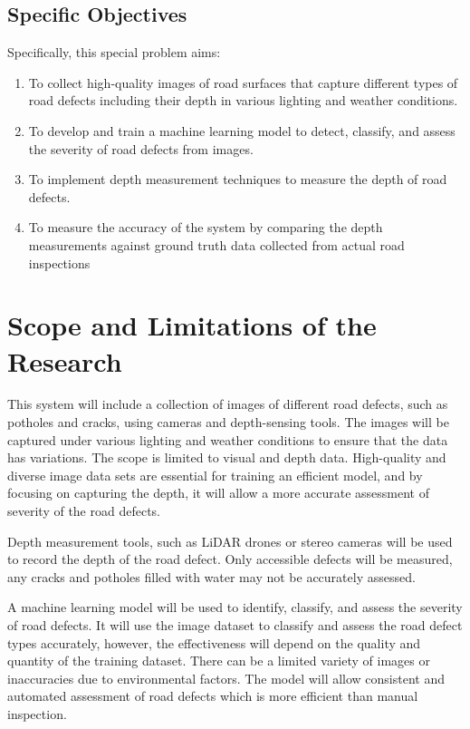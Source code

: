 \subsection{Specific Objectives}
\label{sec:specificobjectives}

Specifically, this special problem aims:
\begin{enumerate}
   \item To collect high-quality images of road surfaces that capture different types of road defects including their depth in various lighting and weather conditions.
   \item To develop and train a machine learning model to detect, classify, and assess the severity of road defects from images. 
   \item To implement depth measurement techniques to measure the depth of road defects.
   \item To measure the accuracy of the system by comparing the depth measurements against ground truth data collected from actual road inspections
\end{enumerate}


\section{Scope and Limitations of the Research}
\label{sec:scopelimitations}



This system will include a collection of images of  different road defects, such as potholes and cracks, using cameras and depth-sensing tools. The images will be captured under various lighting and weather conditions to ensure that the data has variations. The scope is limited to visual and depth data. High-quality and diverse  image data sets are essential for training an efficient model, and by focusing on capturing the depth, it will allow a more accurate assessment of severity of the road defects. 


Depth measurement tools, such as LiDAR drones or stereo cameras will be used to record the depth of the road defect. Only accessible defects will be measured, any cracks and potholes filled with water may not be accurately assessed. 


A machine learning model will be used to identify, classify, and assess the severity of road defects. It will use the image dataset to classify and assess the road defect types accurately, however, the effectiveness will depend on the quality and quantity of the training dataset. There can be a limited variety of images or inaccuracies due to environmental factors. The model will allow consistent and automated assessment of road defects which is more efficient than manual inspection. 


